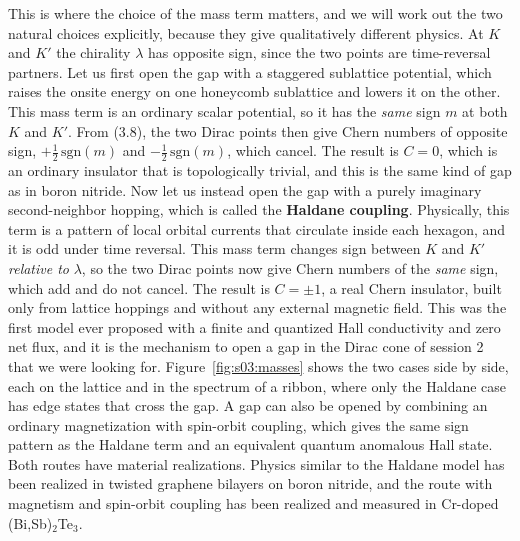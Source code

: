 This is where the choice of the mass term matters, and we will work out the two natural choices
explicitly, because they give qualitatively different physics. At $K$ and $K'$ the chirality
$\lambda$ has opposite sign, since the two points are time-reversal partners. Let us first open the
gap with a staggered sublattice potential, which raises the onsite energy on one honeycomb sublattice
and lowers it on the other. This mass term is an ordinary scalar potential, so it has the \emph{same}
sign $m$ at both $K$ and $K'$. From (3.8), the two Dirac points then give Chern numbers of opposite
sign, $+\tfrac12\,\mathrm{sgn}(m)$ and $-\tfrac12\,\mathrm{sgn}(m)$, which cancel. The result is $C=0$,
which is an ordinary insulator that is topologically trivial, and this is the same kind of gap as in
boron nitride. Now let us instead open the gap with a purely imaginary second-neighbor hopping, which
is called the \textbf{Haldane coupling}. Physically, this term is a pattern of local orbital currents
that circulate inside each hexagon, and it is odd under time reversal. This mass term changes sign
between $K$ and $K'$ \emph{relative to} $\lambda$, so the two Dirac points now give Chern numbers of
the \emph{same} sign, which add and do not cancel. The result is $C = \pm 1$, a real Chern insulator,
built only from lattice hoppings and without any external magnetic field. This was the first model
ever proposed with a finite and quantized Hall conductivity and zero net flux, and it is the mechanism
to open a gap in the Dirac cone of session 2 that we were looking for. Figure~\ref{fig:s03:masses}
shows the two cases side by side, each on the lattice and in the spectrum of a ribbon, where only the
Haldane case has edge states that cross the gap. A gap can also be
opened by combining an ordinary magnetization with spin-orbit coupling, which gives the same sign
pattern as the Haldane term and an equivalent quantum anomalous Hall state. Both routes have material
realizations. Physics similar to the Haldane model has been realized in twisted graphene bilayers on
boron nitride, and the route with magnetism and spin-orbit coupling has been realized and measured in
Cr-doped (Bi,Sb)$_2$Te$_3$.



